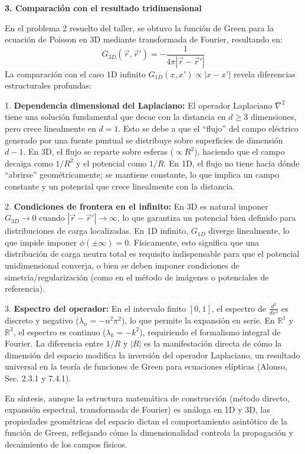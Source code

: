 \documentclass[a4paper]{article}
\begin{document}
\textbf{3. Comparación con el resultado tridimensional}

En el problema 2 resuelto del taller, se obtuvo la función de Green para la ecuación de Poisson en 3D mediante transformada de Fourier, resultando en:
$$ G_{3D}(\vec{r},\vec{r}') = -\frac{1}{4\pi |\vec{r}-\vec{r}'|} $$
La comparación con el caso 1D infinito $G_{1D}(x,x') \propto |x-x'|$ revela diferencias estructurales profundas:

1. \textbf{Dependencia dimensional del Laplaciano:} El operador Laplaciano $\nabla^2$ tiene una solución fundamental que decae con la distancia en $d \ge 3$ dimensiones, pero crece linealmente en $d=1$. Esto se debe a que el ``flujo'' del campo eléctrico generado por una fuente puntual se distribuye sobre superficies de dimensión $d-1$. En 3D, el flujo se reparte sobre esferas ($\propto R^2$), haciendo que el campo decaiga como $1/R^2$ y el potencial como $1/R$. En 1D, el flujo no tiene hacia dónde ``abrirse'' geométricamente; se mantiene constante, lo que implica un campo constante y un potencial que crece linealmente con la distancia.

2. \textbf{Condiciones de frontera en el infinito:} En 3D es natural imponer $G_{3D} \to 0$ cuando $|\vec{r}-\vec{r}'| \to \infty$, lo que garantiza un potencial bien definido para distribuciones de carga localizadas. En 1D infinito, $G_{1D}$ diverge linealmente, lo que impide imponer $\phi(\pm\infty)=0$. Físicamente, esto significa que una distribución de carga neutra total es requisito indispensable para que el potencial unidimensional converja, o bien se deben imponer condiciones de simetría/regularización (como en el método de imágenes o potenciales de referencia).

3. \textbf{Espectro del operador:} En el intervalo finito $[0,1]$, el espectro de $\frac{d^2}{dx^2}$ es discreto y negativo ($\lambda_n = -n^2\pi^2$), lo que permite la expansión en serie. En $\mathbb{R}^1$ y $\mathbb{R}^3$, el espectro es continuo ($\lambda_k = -k^2$), requiriendo el formalismo integral de Fourier. La diferencia entre $1/R$ y $|R|$ es la manifestación directa de cómo la dimensión del espacio modifica la inversión del operador Laplaciano, un resultado universal en la teoría de funciones de Green para ecuaciones elípticas (Alonso, Sec. 2.3.1 y 7.4.1).

En síntesis, aunque la estructura matemática de construcción (método directo, expansión espectral, transformada de Fourier) es análoga en 1D y 3D, las propiedades geométricas del espacio dictan el comportamiento asintótico de la función de Green, reflejando cómo la dimensionalidad controla la propagación y decaimiento de los campos físicos.
\end{document}

